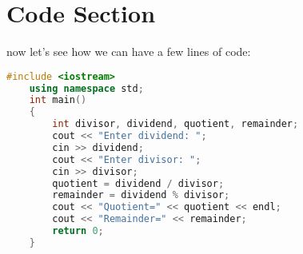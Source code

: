 \documentclass[12pt]{article}
\begin{document}
\newpage
\section{Code Section}
now let's see how we can have a few lines of code:\\
\begin{lstlisting}[language=C++]
    #include <iostream>
    using namespace std;
    int main()
    {    
        int divisor, dividend, quotient, remainder;
        cout << "Enter dividend: ";
        cin >> dividend;
        cout << "Enter divisor: ";
        cin >> divisor;
        quotient = dividend / divisor;
        remainder = dividend % divisor;
        cout << "Quotient=" << quotient << endl;
        cout << "Remainder=" << remainder;
        return 0;
    }
\end{lstlisting}
\end{document}
